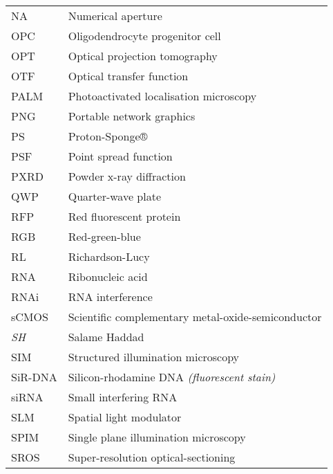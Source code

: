 \begin{flushleft}
\begin{longtable}[l]{|p{5.5em}|p{25em}|}
NA         & Numerical aperture                                         \\
OPC        & Oligodendrocyte progenitor cell                            \\
OPT        & Optical projection tomography                              \\
OTF        & Optical transfer function                                  \\
PALM       & Photoactivated localisation microscopy                     \\
PNG        & Portable network graphics                                  \\
PS		   & Proton-Sponge®												\\
PSF        & Point spread function                                      \\
PXRD       & Powder x-ray diffraction                                   \\
QWP        & Quarter-wave plate                                         \\
RFP        & Red fluorescent protein                                    \\
RGB        & Red-green-blue                                             \\
RL         & Richardson-Lucy                                            \\
RNA        & Ribonucleic acid                                           \\
RNAi       & RNA interference                                           \\
sCMOS      & Scientific complementary metal-oxide-semiconductor         \\
\textit{SH} & Salame Haddad                                             \\
SIM        & Structured illumination microscopy                         \\
SiR-DNA    & Silicon-rhodamine DNA \textit{(fluorescent stain)}         \\
siRNA      & Small interfering RNA                                      \\
SLM        & Spatial light modulator                                    \\
SPIM       & Single plane illumination microscopy                       \\
SROS       & Super-resolution optical-sectioning                        \\

\end{longtable}
\end{flushleft}
